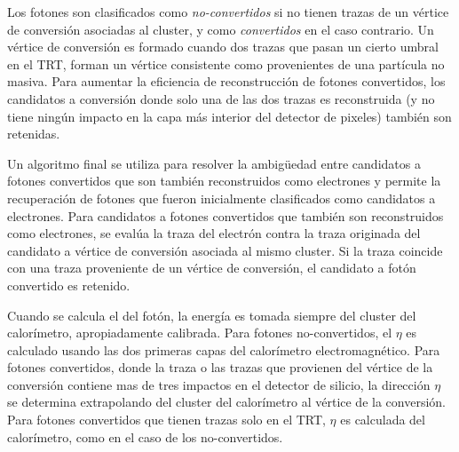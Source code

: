 Los fotones son clasificados como \emph{no-convertidos} si no tienen trazas de
un vértice de conversión asociadas al cluster, y como \emph{convertidos} en el
caso contrario. Un vértice de conversión es formado cuando dos trazas que pasan
un cierto umbral en el TRT, forman un vértice consistente como provenientes de
una partícula no masiva. Para aumentar la eficiencia de reconstrucción de
fotones convertidos, los candidatos a conversión donde solo una de las dos
trazas es reconstruida (y no tiene ningún impacto en la capa más interior del
detector de pixeles) también son retenidas.

Un algoritmo final \cite{PhotonPerf} se utiliza para resolver la
ambigüedad entre candidatos a fotones convertidos que son también reconstruidos
como electrones y permite la recuperación de fotones que fueron inicialmente
clasificados como candidatos a electrones.
Para candidatos a fotones convertidos que también son reconstruidos como
electrones, se evalúa la traza del electrón contra la traza originada del
candidato a vértice de conversión asociada al mismo cluster. Si la traza
coincide con una traza proveniente de un vértice de conversión, el candidato a
fotón convertido es retenido.


Cuando se calcula el {\pt} del fotón, la energía es tomada siempre del cluster
del calorímetro, apropiadamente calibrada\cite{Banfi:1259219}. Para fotones
no-convertidos, el $\eta$ es calculado usando las dos primeras capas del
calorímetro electromagnético. Para fotones convertidos, donde la traza o las
trazas que provienen del vértice de la conversión contiene mas de tres impactos en
el detector de silicio, la dirección $\eta$ se determina extrapolando del
cluster del calorímetro al vértice de la conversión. Para fotones convertidos
que tienen trazas solo en el TRT, $\eta$ es calculada del calorímetro, %
como en el caso de los no-convertidos.

